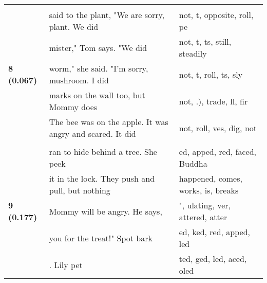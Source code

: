 \documentclass{article}
\begin{document}
\begin{longtable}{|p{}|p{}|p{}|}
& & \\
\multirow{5}{*}{\textbf{8 (0.067)}} & said to the plant, "We are sorry, plant. We did & not, t,  opposite,  roll, pe \\
& mister," Tom says. "We did & not, t, ts,  still,  steadily \\
& worm," she said. "I'm sorry, mushroom. I did & not, t,  roll, ts,  sly \\
& marks on the wall too, but Mommy does & not, .),  trade,  ll,  fir \\
& The bee was on the apple. It was angry and scared. It did & not,  roll, ves, dig, not \\
& & \\
\multirow{5}{*}{\textbf{9 (0.177)}} & ran to hide behind a tree. She peek & ed, apped, red, faced,  Buddha \\
& it in the lock. They push and pull, but nothing & happened,  comes,  works,  is,  breaks \\
& Mommy will be angry. He says, & ", ulating, ver, attered, atter \\
& you for the treat!" Spot bark & ed, ked, red, apped, led \\
& . Lily pet & ted, ged, led, aced, oled \\

\end{longtable}
\end{document}
